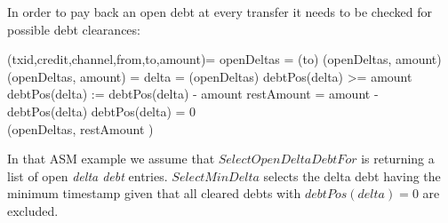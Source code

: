 In order to pay back an open debt at every transfer it needs to be checked for possible debt clearances:

\begin{asm}
	(txid,credit,channel,from,to,amount)=\+
		\LET openDeltas = (to)\+
			(openDeltas, amount)\dec\-
	\WHERE \+
		(openDeltas, amount) =\+
		\LET delta = (openDeltas)\+
			\IF debtPos(delta) >= amount \THEN\+
				debtPos(delta) := debtPos(delta) - amount\-
			\ELSE\+
				\LET restAmount = amount - debtPos(delta)\+
					debtPos(delta) = 0\SEQ\\
					(openDeltas, restAmount )\dec\dec\dec\-
\end{asm}

In that ASM example we assume that $SelectOpenDeltaDebtFor$ is returning a list of open \textit{delta debt} entries. $SelectMinDelta$ selects the delta debt having the minimum timestamp given that all cleared debts with $debtPos(delta)=0$ are excluded.